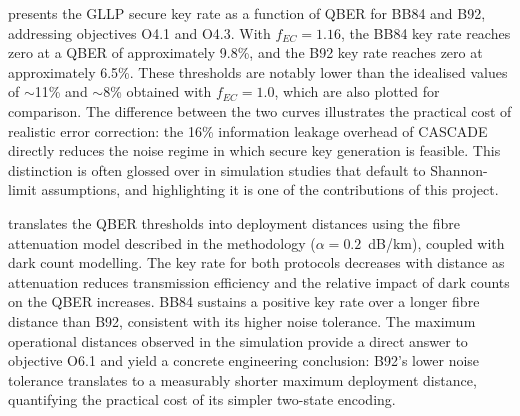 

 presents the GLLP secure key rate as a function of QBER for BB84 and B92, addressing objectives O4.1 and O4.3. With $f_{EC} = 1.16$, the BB84 key rate reaches zero at a QBER of approximately 9.8\%, and the B92 key rate reaches zero at approximately 6.5\%. These thresholds are notably lower than the idealised values of $\sim$11\% and $\sim$8\% obtained with $f_{EC} = 1.0$, which are also plotted for comparison. The difference between the two curves illustrates the practical cost of realistic error correction: the 16\% information leakage overhead of CASCADE directly reduces the noise regime in which secure key generation is feasible. This distinction is often glossed over in simulation studies that default to Shannon-limit assumptions, and highlighting it is one of the contributions of this project.

 translates the QBER thresholds into deployment distances using the fibre attenuation model described in the methodology ($\alpha = 0.2$~dB/km), coupled with dark count modelling. The key rate for both protocols decreases with distance as attenuation reduces transmission efficiency and the relative impact of dark counts on the QBER increases. BB84 sustains a positive key rate over a longer fibre distance than B92, consistent with its higher noise tolerance. The maximum operational distances observed in the simulation provide a direct answer to objective O6.1 and yield a concrete engineering conclusion: B92's lower noise tolerance translates to a measurably shorter maximum deployment distance, quantifying the practical cost of its simpler two-state encoding.

